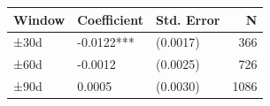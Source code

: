 \caption{PSA — 7D_EWMA_Intraday_Price_Volatility 多窗口稳健性检验}
\begin{tabular}{lllr}
\toprule
Window & Coefficient & Std. Error & N \\
\midrule
±30d & -0.0122*** & (0.0017) & 366 \\
±60d & -0.0012 & (0.0025) & 726 \\
±90d & 0.0005 & (0.0030) & 1086 \\
\bottomrule
\end{tabular}
